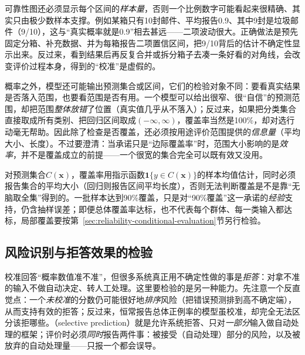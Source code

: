 可靠性图还必须显示每个区间的\emph{样本量}，否则一个比例数字可能看起来很精确、其实只由极少数样本支撑。例如某箱只有10封邮件、平均报告0.9、其中9封是垃圾邮件（9/10），这与“真实概率就是0.9”相去甚远——二项波动很大。正确做法是预先固定分箱、补充数据、并为每箱报告二项置信区间，把9/10背后的估计不确定性显示出来。反过来，看到结果后再反复合并或拆分箱子去凑一条好看的对角线，会改变评价过程本身，得到的“校准”是虚假的。

概率之外，模型还可能输出预测集合或区间，它们的检验对象不同：要看真实结果是否落入范围，也要看范围是否有用。一个模型可以给出很窄、很“自信”的预测范围，却把范围\emph{整体放错}了位置（真实值几乎从不落入）；反过来，如果把分类集合直接取成所有类别、把回归区间取成$(-\infty,\infty)$，覆盖率当然是100\%，却对选行动毫无帮助。因此除了检查是否覆盖，还必须按用途评价范围提供的\emph{信息量}（平均大小、长度）。不过要澄清：当承诺只是“边际覆盖率”时，范围大小影响的是\emph{效率}，并不是覆盖成立的前提——一个很宽的集合完全可以既有效又没用。

对预测集合$C(\bm{x})$，覆盖率用指示函数$\mathbf 1\{y\in C(\bm{x})\}$的样本均值估计，同时必须报告集合的平均大小（回归则报告区间平均长度），否则无法判断覆盖是不是靠“无脑取全集”得到的。一批样本达到90\%覆盖，只是对“90\%覆盖”这一承诺的\emph{经验}支持，仍含抽样误差；即便总体覆盖率达标，也不代表每个群体、每一类输入都达标，局部覆盖要按第~\ref{sec:reliability-conditional-evaluation}节另行检验。

\subsection{风险识别与拒答效果的检验}
\label{sec:reliability-selection-evaluation}

校准回答“概率数值准不准”，但很多系统真正用不确定性做的事是\emph{拒答}：对拿不准的输入不做自动决定、转人工处理。这里要检验的是另一种能力。先注意一个反直觉点：一个\emph{未校准}的分数仍可能很好地\emph{排序}风险（把错误预测排到高不确定端），从而支持有效的拒答；反过来，恒常报告总体正例率的模型虽校准，却完全无法区分该拒哪些。（selective prediction）就是允许系统拒答、只对\emph{一部分}输入做自动处理的框架；评价时必须\emph{同时}报告两件事：被接受（自动处理）部分的风险，以及被放弃的自动处理量——只报一个都会误导。

